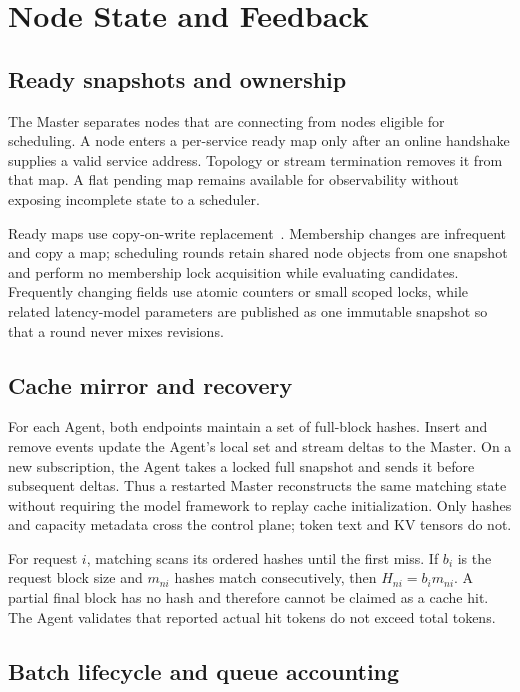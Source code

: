 \documentclass[10pt]{article}
\begin{document}
\section{Node State and Feedback}
\label{sec:state}

\subsection{Ready snapshots and ownership}

The Master separates nodes that are connecting from nodes eligible for
scheduling. A node enters a per-service ready map only after an online
handshake supplies a valid service address. Topology or stream termination
removes it from that map. A flat pending map remains available for observability
without exposing incomplete state to a scheduler.

Ready maps use copy-on-write replacement~\cite{copyonwrite}. Membership
changes are infrequent and copy a map; scheduling rounds retain shared node
objects from one snapshot and perform no membership lock acquisition while
evaluating candidates. Frequently changing fields use atomic counters or
small scoped locks, while related latency-model parameters are published as
one immutable snapshot so that a round never mixes revisions.

\subsection{Cache mirror and recovery}

For each Agent, both endpoints maintain a set of full-block hashes. Insert and
remove events update the Agent's local set and stream deltas to the Master. On
a new subscription, the Agent takes a locked full snapshot and sends it before
subsequent deltas. Thus a restarted Master reconstructs the same matching
state without requiring the model framework to replay cache initialization.
Only hashes and capacity metadata cross the control plane; token text and KV
tensors do not.

For request $i$, matching scans its ordered hashes until the first miss. If
$b_i$ is the request block size and $m_{ni}$ hashes match consecutively, then
$H_{ni}=b_i m_{ni}$. A partial final block has no hash and therefore cannot be
claimed as a cache hit. The Agent validates that reported actual hit tokens do
not exceed total tokens.

\subsection{Batch lifecycle and queue accounting}
\end{document}
